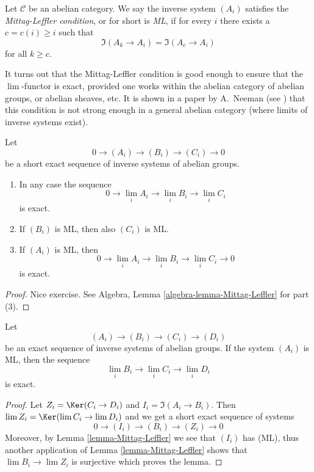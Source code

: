 \begin{definition}
\label{definition-Mittag-Leffler}
Let $\mathcal{C}$ be an abelian category.
We say the inverse system $(A_i)$
satisfies the {\it Mittag-Leffler condition}, or for short
is {\it ML}, if for every $i$ there exists a $c = c(i) \geq i$
such that
$$
\Im(A_k \to A_i) = \Im(A_c \to A_i)
$$
for all $k \geq c$.
\end{definition}

\noindent
It turns out that the Mittag-Leffler condition is good enough to ensure
that the $\lim$-functor is exact, provided one works within
the abelian category of abelian groups, or abelian sheaves, etc.
It is shown in a paper by A.\ Neeman (see \cite{Neeman-Counterexample})
that this condition is not strong enough in a general abelian
category (where limits of inverse systems exist).

\begin{lemma}
\label{lemma-Mittag-Leffler}
Let
$$
0 \to (A_i) \to (B_i) \to (C_i) \to 0
$$
be a short exact sequence of inverse systems of abelian groups.
\begin{enumerate}
\item In any case the sequence
$$
0 \to \lim_i A_i \to \lim_i B_i \to \lim_i C_i
$$
is exact.
\item If $(B_i)$ is ML, then also $(C_i)$ is ML.
\item If $(A_i)$ is ML, then
$$
0 \to \lim_i A_i \to \lim_i B_i \to \lim_i C_i \to 0
$$
is exact.
\end{enumerate}
\end{lemma}

\begin{proof}
Nice exercise. See
Algebra, Lemma \ref{algebra-lemma-Mittag-Leffler} for part (3).
\end{proof}

\begin{lemma}
\label{lemma-apply-Mittag-Leffler}
Let
$$
(A_i) \to (B_i) \to (C_i) \to (D_i)
$$
be an exact sequence of inverse systems of abelian groups. If the
system $(A_i)$ is ML, then the sequence
$$
\lim_i B_i \to \lim_i C_i \to \lim_i D_i
$$
is exact.
\end{lemma}

\begin{proof}
Let $Z_i = \Ker(C_i \to D_i)$ and $I_i = \Im(A_i \to B_i)$.
Then $\lim Z_i = \Ker(\lim C_i \to \lim D_i)$ and
we get a short exact sequence of systems
$$
0 \to (I_i) \to (B_i) \to (Z_i) \to 0
$$
Moreover, by
Lemma \ref{lemma-Mittag-Leffler}
we see that $(I_i)$ has (ML), thus another application of
Lemma \ref{lemma-Mittag-Leffler}
shows that $\lim B_i \to \lim Z_i$ is surjective which
proves the lemma.
\end{proof}

